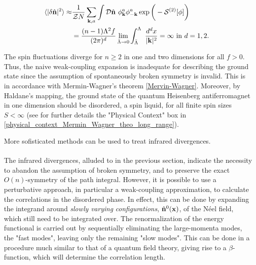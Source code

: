 \begin{equation}
    \begin{split}
        \langle |\delta \hat{\bf n}|^2 \rangle \approx& \frac{1}{\mathcal{Z}N} \sum_{{\bf k}, a} \int \mathcal{D}\hat{{\bf n}} \textnormal{ } \phi_{{\bf k}}^{a}\phi_{-{\bf k}}^{a} \exp 
        \bigg(
             - \mathcal{S}^{(2)}[\phi]
        \bigg) \\
        &= \frac{(n-1) \Lambda^2 f}{(2\pi)^d} \lim_{\bar{\Lambda} \rightarrow 0} \int_{\bar{\Lambda}}^{\Lambda} \textnormal{ } \frac{d^dx}{|{\bf k}|^2} = \infty \textnormal{ in $d=1,2$. }
    \end{split}
\end{equation}

The spin fluctuations diverge for $n \geq 2$ in one and two dimensions for all $f>0$. 
Thus, the naive weak-coupling expansion is inadequate for describing the ground state since the assumption of spontaneously broken symmetry is invalid. This is in accordance with Mermin-Wagner's theorem \cref{Mervin-Wagner}.
Moreover, by Haldane's mapping, the ground state of the quantum Heisenberg antiferromagnet in one dimension should be disordered, a spin liquid, for all finite spin sizes $S < \infty$ (see for further details the "Physical Context" box in \cref{physical_context_Mermin_Wagner_theo_long_range}).  

\medbreak

More sofisticated methods can be used to treat infrared divergences. \bigbreak

\paragraph{}

The infrared divergences, alluded to in the previous section, indicate the necessity to abandon the assumption of broken symmetry, and to preserve the exact $O(n)$-symmetry of the path integral. 
However, it is possible to use a perturbative approach, in particular a weak-coupling approximation, to calculate the correlations in the disordered phase. 
In effect, this can be done by expanding the integrand around \textit{slowly varying configurations}, $\hat{{\bf n}}^{0}({\bf x})$, of the Néel field, which still need to be integrated over. The renormalization of the energy functional is carried out by sequentially eliminating the large-momenta modes, the "fast modes", leaving only the remaining "slow modes".
This can be done in a procedure much similar to that of a  quantum field theory, giving rise to a $\beta$-function, which will determine the correlation length. \bigbreak

